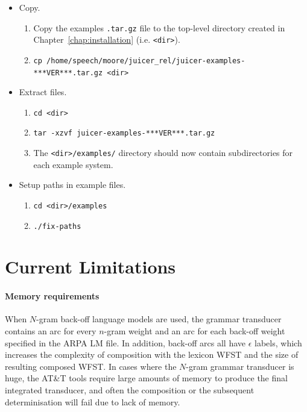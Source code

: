 \documentclass[a4paper,12pt]{report}
\begin{document}
\begin{itemize}
\item Copy.
\begin{enumerate}
   \item Copy the examples {\tt .tar.gz} file to the top-level directory created in Chapter~\ref{chap:installation} (i.e. {\tt <dir>}).
   \item {\tt cp /home/speech/moore/juicer\_rel/juicer-examples-***VER***.tar.gz <dir>}
\end{enumerate}
\item Extract files.
\begin{enumerate}
   \item {\tt cd <dir>}
   \item {\tt tar -xzvf juicer-examples-***VER***.tar.gz}
   \item The {\tt <dir>/examples/} directory should now contain subdirectories for each example system.
\end{enumerate}
\item Setup paths in example files.
\begin{enumerate}
   \item {\tt cd <dir>/examples}
   \item {\tt ./fix-paths}
\end{enumerate}
\end{itemize}


\chapter{Current Limitations}
\label{chap:limitations}

\subsubsection{Memory requirements}

When $N$-gram back-off language models are used, the grammar transducer contains an arc for every $n$-gram weight and an arc for each back-off weight specified in the ARPA LM file. In addition, back-off arcs all have $\epsilon$ labels, which increases the complexity of composition with the lexicon WFST and the size of resulting composed WFST. In cases where the $N$-gram grammar transducer is huge, the AT\&T tools require large amounts of memory to produce the final integrated transducer, and often the composition or the subsequent determinisation will fail due to lack of memory.
\end{document}
